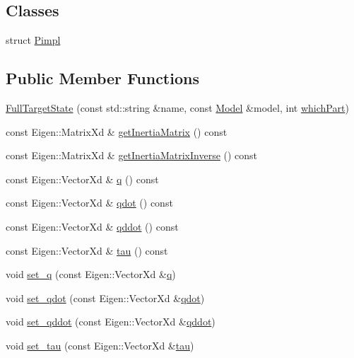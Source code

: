 \subsection*{Classes}
\begin{DoxyCompactItemize}
\item 
struct \hyperlink{structocra_1_1FullTargetState_1_1Pimpl}{Pimpl}
\end{DoxyCompactItemize}
\subsection*{Public Member Functions}
\begin{DoxyCompactItemize}
\item 
\hyperlink{classocra_1_1FullTargetState_a8164de6021f986fb82022b2fed1e0402}{Full\+Target\+State} (const std\+::string \&name, const \hyperlink{classocra_1_1Model}{Model} \&model, int \hyperlink{classocra_1_1FullState_a489d85a3e8d2a88f31f0cac4e5f445bf}{which\+Part})
\item 
const Eigen\+::\+Matrix\+Xd \& \hyperlink{classocra_1_1FullTargetState_a6c98890034e1f65c84212a3e8173e120}{get\+Inertia\+Matrix} () const 
\item 
const Eigen\+::\+Matrix\+Xd \& \hyperlink{classocra_1_1FullTargetState_ab8849324b452cf380504d8e10cb2d119}{get\+Inertia\+Matrix\+Inverse} () const 
\item 
const Eigen\+::\+Vector\+Xd \& \hyperlink{classocra_1_1FullTargetState_ad317e77d138731dc10866830bfc79488}{q} () const 
\item 
const Eigen\+::\+Vector\+Xd \& \hyperlink{classocra_1_1FullTargetState_adbdd604949ec1909dad85f7a9e50136b}{qdot} () const 
\item 
const Eigen\+::\+Vector\+Xd \& \hyperlink{classocra_1_1FullTargetState_a4bdfc96d96dc0eab7ddc52c88c7f4cb8}{qddot} () const 
\item 
const Eigen\+::\+Vector\+Xd \& \hyperlink{classocra_1_1FullTargetState_a78fac4439144e65b232ed1e635661392}{tau} () const 
\item 
void \hyperlink{classocra_1_1FullTargetState_a902f4f9662d53b930073cab837ab7835}{set\+\_\+q} (const Eigen\+::\+Vector\+Xd \&\hyperlink{classocra_1_1FullTargetState_ad317e77d138731dc10866830bfc79488}{q})
\item 
void \hyperlink{classocra_1_1FullTargetState_afdaa12a27a353e3aca61212fa1313c5b}{set\+\_\+qdot} (const Eigen\+::\+Vector\+Xd \&\hyperlink{classocra_1_1FullTargetState_adbdd604949ec1909dad85f7a9e50136b}{qdot})
\item 
void \hyperlink{classocra_1_1FullTargetState_a462f462af7480759f251cc2087c747e7}{set\+\_\+qddot} (const Eigen\+::\+Vector\+Xd \&\hyperlink{classocra_1_1FullTargetState_a4bdfc96d96dc0eab7ddc52c88c7f4cb8}{qddot})
\item 
void \hyperlink{classocra_1_1FullTargetState_a351cd0cf06d81362558128b0d8d4149a}{set\+\_\+tau} (const Eigen\+::\+Vector\+Xd \&\hyperlink{classocra_1_1FullTargetState_a78fac4439144e65b232ed1e635661392}{tau})
\end{DoxyCompactItemize}
